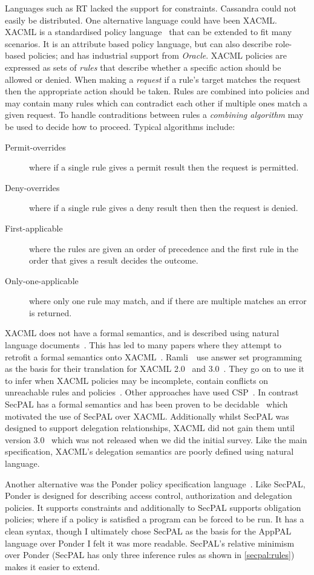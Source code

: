 \documentclass[thesis.tex]{subfiles}
\begin{document}
Languages such as RT lacked the support for constraints.  Cassandra could not easily be distributed. 
One alternative language could have been XACML.  
XACML is a standardised policy language~\cite{oasis_extensible_2013} that can be extended to fit many scenarios.  
It is an attribute based policy language, but can also describe role-based policies; and has industrial support from \emph{Oracle}.
XACML policies are expressed as sets of \emph{rules} that describe whether a specific action should be allowed or denied.
When making a \emph{request} if a rule's target matches the request then the appropriate action should be taken.
Rules are combined into policies and may contain many rules which can contradict each other if multiple ones match a given request.
To handle contraditions between rules a \emph{combining algorithm} may be used to decide how to proceed.
Typical algorithms include:
\begin{description}
  \item[Permit-overrides] where if a single rule gives a permit result then the request is permitted.
  \item[Deny-overrides] where if a single rule gives a deny result then then the request is denied.
  \item[First-applicable] where the rules are given an order of precedence and the first rule in the order that gives a result decides the outcome.
  \item[Only-one-applicable] where only one rule may match, and if there are multiple matches an error is returned.
\end{description}

XACML does not have a formal semantics, and is described using natural language documents~\cite{oasis_extensible_2013}. This has led to many papers where they attempt to retrofit a formal semantics onto XACML~\cite{masi_formalisation_2012}.  Ramli~\etal~use answer set programming as the basis for their translation for XACML 2.0~\cite{ramli_xacml_2012} and 3.0~\cite{ramli_logic_2014}.  They go on to use it to infer when XACML policies may be incomplete, contain conflicts on unreachable rules and policies~\cite{ramli_detecting_2015}. Other approaches have used CSP~\cite{bryans_reasoning_2005}.  In contrast SecPAL has a formal semantics and has been proven to be decidable~\cite{becker_secpal:_2010} which motivated the use of SecPAL over XACML.  Additionally whilst SecPAL was designed to support delegation relationships, XACML did not gain them until version 3.0~\cite{oasis_xacml_2010} which was not released when we did the initial survey.  Like the main specification, XACML's delegation semantics are poorly defined using natural language.

Another alternative was the Ponder policy specification language~\cite{damianou_ponder_2001}.
Like SecPAL, Ponder is designed for describing access control, authorization and delegation policies.
It supports constraints and additionally to SecPAL supports obligation policies; where if a policy is satisfied a program can be forced to be run.  It has a clean syntax, though 
I ultimately chose SecPAL as the basis for the AppPAL language over Ponder I felt it was more readable.
SecPAL's relative minimism over Ponder (SecPAL has only three inference rules as shown in \autoref{secpal:rules}) makes it easier to extend.
\end{document}
